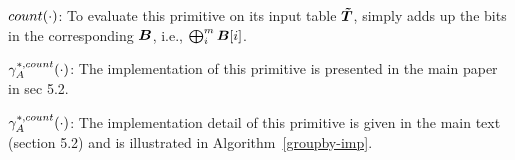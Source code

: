  $count(\cdot)$: To evaluate this primitive on its input table $\boldsymbol{\tilde{T}}$, \system simply  adds up the bits in the corresponding $\boldsymbol{B}$, i.e., $\bigoplus_{i}^m \boldsymbol{B}[i]$.


 $\gamma^{*,count}_{A}(\cdot)$: The implementation of this primitive is presented in the main paper in sec 5.2. %


 $\gamma^{*,count}_A(\cdot)$: The implementation detail of this primitive is given in the main text (section 5.2) and is illustrated in Algorithm~\ref{groupby-imp}.

